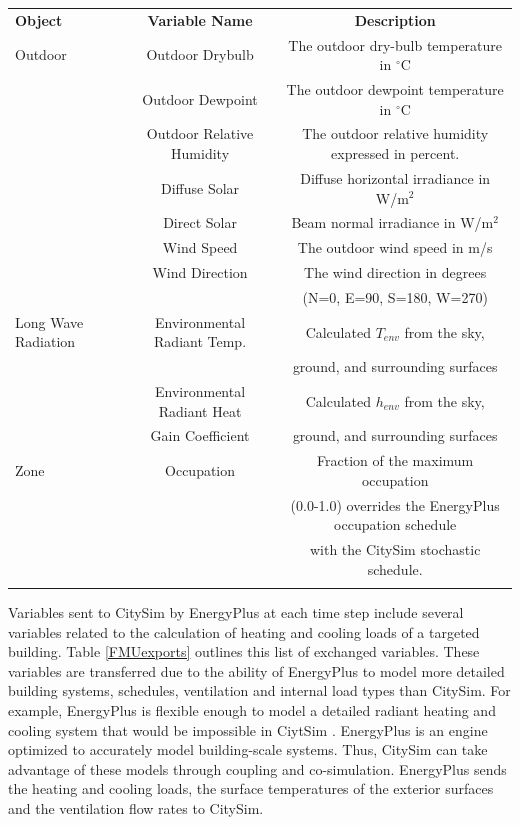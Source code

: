 \documentclass{tBPS2e}
\theoremstyle{plain}
\theoremstyle{definition}
\theoremstyle{remark}
\newcommand{\noteDT}[1]{\footnote{\textcolor{green}{#1}}}
\begin{document}

\begin{table}[H]
{\begin{tabular}[l]{@{}lcc}\toprule
  \bf{Object} &  \bf{Variable Name} & \bf{Description} \\
\colrule
  Outdoor & Outdoor Drybulb & The outdoor dry-bulb temperature in $^{\circ}\mathrm{C}$ \\
 & Outdoor Dewpoint & The outdoor dewpoint temperature in $^{\circ}\mathrm{C}$ \\
 & Outdoor Relative Humidity & The outdoor relative humidity expressed in percent. \\
 & Diffuse Solar & Diffuse horizontal irradiance in W/m$^2$ \\
 & Direct Solar & Beam normal irradiance in W/m$^2$ \\
 & Wind Speed & The outdoor wind speed in m/s \\
 & Wind Direction & The wind direction in degrees\\&&  (N=0, E=90, S=180, W=270) \\
 \hline
 Long Wave Radiation & Environmental Radiant Temp. & Calculated $T_{env}$ from the sky,\\&& ground, and surrounding surfaces \\
 & Environmental Radiant Heat  & Calculated $h_{env}$ from the sky,\\
 & Gain Coefficient & ground, and surrounding surfaces \\
 
 \hline
Zone & Occupation & Fraction of the maximum occupation\\&& (0.0-1.0) overrides the EnergyPlus occupation schedule\\&&  with the CitySim stochastic schedule. \\
\botrule
\end{tabular}}
\label{FMUimports}
\end{table}

Variables sent to CitySim by EnergyPlus at each time step include several
variables related to the calculation of heating and cooling loads of a
targeted building. Table \ref{FMUexports} outlines this list of exchanged variables.
These variables are transferred due to the ability of
EnergyPlus to model more detailed building systems, schedules, ventilation and
internal load types than CitySim. For example, EnergyPlus is flexible enough
to model a detailed radiant heating and cooling system that would be
impossible in CiytSim \citep{barbara:2015tz}. EnergyPlus is an engine
optimized to accurately model building-scale systems. Thus, CitySim can take 
advantage of these models through coupling and co-simulation. EnergyPlus sends
the heating and cooling loads, the surface temperatures of the exterior
surfaces and the ventilation flow rates to CitySim.
\end{document}
